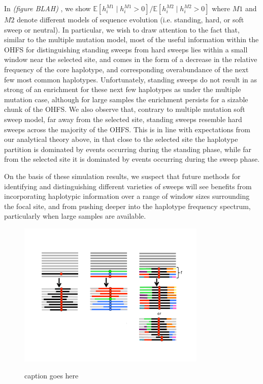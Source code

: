 \documentclass[a4paper,10pt]{article}
\newcommand{\jb}[1]{{\it\color{blue} (#1)} }
\begin{document}
In \jb{figure BLAH}, we show $\mathbb{E}[h_i^{M1} \mid h_i^{M1} > 0]/\mathbb{E}[h_i^{M2} \mid h_i^{M2} > 0]$ where $M1$ and $M2$ denote different models of sequence evolution (i.e. standing, hard, or soft sweep or neutral). In particular, we wish to draw attention to the fact that, similar to the multiple mutation model, most of the useful information within the OHFS for distinguishing standing sweeps from hard sweeps lies within a small window near the selected site, and comes in the form of a decrease in the relative frequency of the core haplotype, and corresponding overabundance of the next few most common haplotypes. Unfortunately, standing sweeps do not result in as strong of an enrichment for these next few haplotypes as under the multiple mutation case, although for large samples the enrichment persists for a sizable chunk of the OHFS. We also observe that, contrary to multiple mutation soft sweep model, far away from the selected site, standing sweeps resemble hard sweeps across the majority of the OHFS. This is in line with expectations from our analytical theory above, in that close to the selected site the haplotype partition is dominated by events occurring during the standing phase, while far from the selected site it is dominated by events occurring during the sweep phase.

On the basis of these simulation results, we suspect that future methods for identifying and distinguishing different varieties of sweeps will see benefits from incorporating haplotypic information over a range of window sizes surrounding the focal site, and from pushing deeper into the haplotype frequency spectrum, particularly when large samples are available.

\begin{figure}
	\includegraphics[width = 0.8\textwidth]{../Paper_Figures/three_kinds_of_sweep.pdf} \label{cartoon_3_kinds}
	\caption{caption goes here}
\end{figure}
\end{document}
